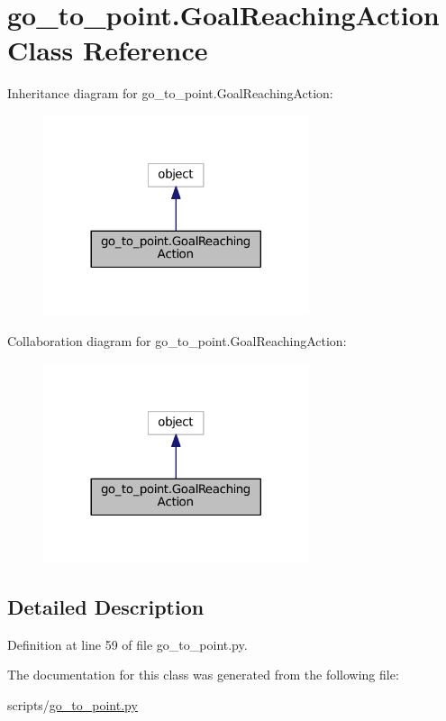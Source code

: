\hypertarget{classgo__to__point_1_1_goal_reaching_action}{}\section{go\+\_\+to\+\_\+point.\+Goal\+Reaching\+Action Class Reference}
\label{classgo__to__point_1_1_goal_reaching_action}


Inheritance diagram for go\+\_\+to\+\_\+point.\+Goal\+Reaching\+Action\+:\nopagebreak
\begin{figure}[H]
\begin{center}
\leavevmode
\includegraphics[width=221pt]{classgo__to__point_1_1_goal_reaching_action__inherit__graph}
\end{center}
\end{figure}


Collaboration diagram for go\+\_\+to\+\_\+point.\+Goal\+Reaching\+Action\+:\nopagebreak
\begin{figure}[H]
\begin{center}
\leavevmode
\includegraphics[width=221pt]{classgo__to__point_1_1_goal_reaching_action__coll__graph}
\end{center}
\end{figure}


\subsection{Detailed Description}


Definition at line 59 of file go\+\_\+to\+\_\+point.\+py.



The documentation for this class was generated from the following file\+:\begin{DoxyCompactItemize}
\item 
scripts/\hyperlink{go__to__point_8py}{go\+\_\+to\+\_\+point.\+py}\end{DoxyCompactItemize}
